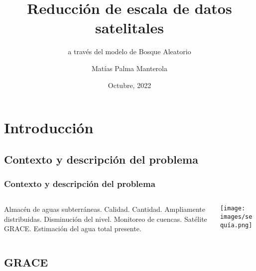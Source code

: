 \documentclass{beamer}
\title[Aumento de resolución a través del modelo \textit{Random Forest}] %
{Reducción de escala de datos satelitales}
\subtitle{a través del modelo de Bosque Aleatorio}
\author[] %
{Matías Palma Manterola}
\institute[UFRO] %
{
Universidad de La Frontera
}
\date[] %
{Octubre, 2022}
\begin{document}
  \frame{\titlepage}

  \section{Introducción}

  \subsection*{Contexto y descripción del problema}

  \begin{frame}
    \frametitle{Contexto y descripción del problema}

    \begin{columns}

      \begin{column}{0.5\textwidth}
        \begin{outline}
          \1 {Almacén de aguas subterráneas.}
            \2 Calidad.
            \2 Cantidad.
            \2 Ampliamente distribuidas.
            \2 Disminución del nivel.
          \1 {Monitoreo de cuencas.}
          \1 {Satélite GRACE.}
            \2 Estimación del agua total presente.
        \end{outline}
      \end{column}

      \begin{column}{0.5\textwidth}
        \begin{center}
          \texttt{[image: images/sequía.png]}
        \end{center}
      \end{column}

    \end{columns}

  \end{frame}

  \subsection*{GRACE}
\end{document}
